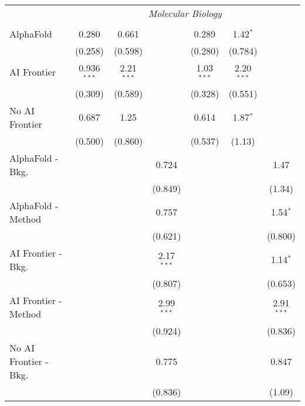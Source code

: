\begin{tabular}{lcccccc}
 & \multicolumn{6}{c}{\textit{Molecular Biology}} \\ \\
   AlphaFold               & 0.280         & 0.661        &              & 0.289        & 1.42$^{*}$   &   \\   
                           & (0.258)       & (0.598)      &              & (0.280)      & (0.784)      &   \\   
   AI Frontier             & 0.936$^{***}$ & 2.21$^{***}$ &              & 1.03$^{***}$ & 2.20$^{***}$ &   \\   
                           & (0.309)       & (0.589)      &              & (0.328)      & (0.551)      &   \\   
   No AI Frontier          & 0.687         & 1.25         &              & 0.614        & 1.87$^{*}$   &   \\   
                           & (0.500)       & (0.860)      &              & (0.537)      & (1.13)       &   \\   
   AlphaFold - Bkg.        &               &              & 0.724        &              &              & 1.47\\   
                           &               &              & (0.849)      &              &              & (1.34)\\   
   AlphaFold - Method      &               &              & 0.757        &              &              & 1.54$^{*}$\\   
                           &               &              & (0.621)      &              &              & (0.800)\\   
   AI Frontier - Bkg.      &               &              & 2.17$^{***}$ &              &              & 1.14$^{*}$\\   
                           &               &              & (0.807)      &              &              & (0.653)\\   
   AI Frontier - Method    &               &              & 2.99$^{***}$ &              &              & 2.91$^{***}$\\   
                           &               &              & (0.924)      &              &              & (0.836)\\   
   No AI Frontier - Bkg.   &               &              & 0.775        &              &              & 0.847\\   
                           &               &              & (0.836)      &              &              & (1.09)\\   

\end{tabular}
